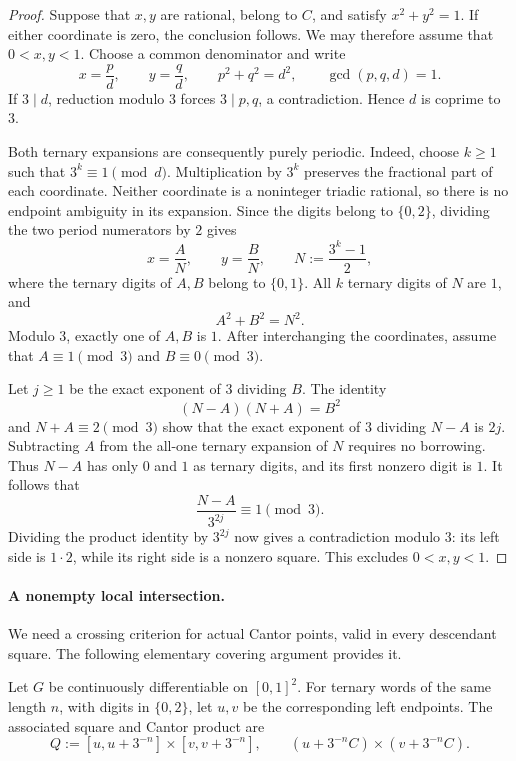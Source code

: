 \documentclass[11pt,a4paper]{amsart}
\numberwithin{equation}{section}
\theoremstyle{definition}
\begin{document}
\begin{proof}
Suppose that \(x,y\) are rational, belong to \(C\), and satisfy
\(x^2+y^2=1\). If either coordinate is zero, the conclusion follows.
We may therefore assume that \(0<x,y<1\).
Choose a common denominator and write
\[
x=\frac{p}{d},\qquad y=\frac{q}{d},\qquad
p^2+q^2=d^2,\qquad \gcd(p,q,d)=1.
\]
If \(3\mid d\), reduction modulo \(3\) forces \(3\mid p,q\), a
contradiction. Hence \(d\) is coprime to \(3\).

Both ternary expansions are consequently purely periodic.
Indeed, choose \(k\geq1\) such that \(3^k\equiv1\pmod d\).
Multiplication by \(3^k\) preserves the fractional part of each
coordinate. Neither coordinate is a noninteger triadic rational, so
there is no endpoint ambiguity in its expansion.
Since the digits belong to \(\{0,2\}\), dividing the two period
numerators by \(2\) gives
\[
x=\frac{A}{N},\qquad y=\frac{B}{N},
\qquad N:=\frac{3^k-1}{2},
\]
where the ternary digits of \(A,B\) belong to \(\{0,1\}\).
All \(k\) ternary digits of \(N\) are \(1\), and
\[
A^2+B^2=N^2.
\]
Modulo \(3\), exactly one of \(A,B\) is \(1\).
After interchanging the coordinates, assume that
\(A\equiv1\pmod3\) and \(B\equiv0\pmod3\).

Let \(j\geq1\) be the exact exponent of \(3\) dividing \(B\).
The identity
\[
(N-A)(N+A)=B^2
\]
and \(N+A\equiv2\pmod3\) show that the exact exponent of \(3\)
dividing \(N-A\) is \(2j\).
Subtracting \(A\) from the all-one ternary expansion of \(N\)
requires no borrowing. Thus \(N-A\) has only \(0\) and \(1\) as
ternary digits, and its first nonzero digit is \(1\).
It follows that
\[
\frac{N-A}{3^{2j}}\equiv1\pmod3.
\]
Dividing the product identity by \(3^{2j}\) now gives a contradiction
modulo \(3\): its left side is \(1\cdot2\), while its right side is
a nonzero square. This excludes \(0<x,y<1\).
\end{proof}

\paragraph{A nonempty local intersection.}\label{sec:source}

We need a crossing criterion for actual Cantor points, valid in every
descendant square. The following elementary covering argument provides
it.

Let \(G\) be continuously differentiable on \([0,1]^2\). For ternary
words of the same length \(n\), with digits in \(\{0,2\}\), let \(u,v\)
be the corresponding left endpoints. The associated square and Cantor
product are
\[
Q:=[u,u+3^{-n}]\times[v,v+3^{-n}],
\qquad
(u+3^{-n}C)\times(v+3^{-n}C).
\]
\end{document}

